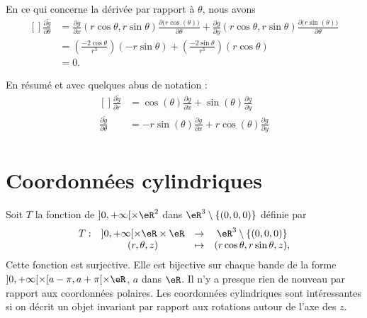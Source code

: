 En ce qui concerne la dérivée par rapport à $\theta$, nous avons
\begin{equation}
    \begin{aligned}[]
    \frac{ \partial \tilde g }{ \partial \theta }&=\frac{ \partial g }{ \partial x }(r\cos\theta,r\sin\theta)\frac{ \partial \big( r\cos(\theta) \big) }{ \partial \theta }+\frac{ \partial g }{ \partial y }(r\cos\theta,r\sin\theta)\frac{ \partial \big( r\sin(\theta) \big) }{ \partial \theta }\\
    &=\left( \frac{ -2\cos\theta }{ r^3 } \right)(-r\sin\theta)+\left( \frac{ -2\sin\theta }{ r^3 } \right)(r\cos\theta)\\
    &=0.
    \end{aligned}
\end{equation}

En résumé et avec quelques abus de notation :
\begin{equation}
    \begin{aligned}[]
        \frac{ \partial \tilde g }{ \partial r }&=\cos(\theta)\frac{ \partial g }{ \partial x }+\sin(\theta)\frac{ \partial g }{ \partial y }\\
        \frac{ \partial \tilde g }{ \partial \theta }&=-r\sin(\theta)\frac{ \partial g }{ \partial x }+r\cos(\theta)\frac{ \partial g }{ \partial y }\\
    \end{aligned}
\end{equation}

\section{Coordonnées cylindriques}

Soit $T$ la fonction de $]0, +\infty[\times \eR^2$ dans $\eR^3\setminus\{(0,0,0)\}$ définie par
\begin{equation}
  \begin{array}{lccc}
    T: &]0, +\infty[\times \eR\times \eR & \to & \eR^3\setminus\{(0,0,0)\}\\
 & (r, \theta, z)&\mapsto& (r\cos \theta, r \sin \theta, z),
  \end{array}
\end{equation}
Cette fonction est surjective. Elle est bijective sur chaque bande de la forme  $]0, +\infty[\times [a-\pi,a+\pi[\times \eR$, $a$ dans $\eR$. Il n'y a presque rien de nouveau par rapport aux coordonnées polaires. Les coordonnées  cylindriques sont intéressantes si on décrit un objet invariant par rapport aux rotations autour de l'axe des $z$.

